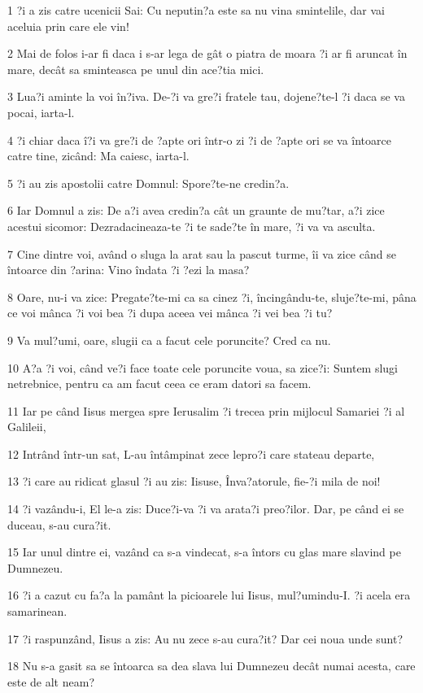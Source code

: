 \par 1 ?i a zis catre ucenicii Sai: Cu neputin?a este sa nu vina smintelile, dar vai aceluia prin care ele vin!
\par 2 Mai de folos i-ar fi daca i s-ar lega de gât o piatra de moara ?i ar fi aruncat în mare, decât sa sminteasca pe unul din ace?tia mici.
\par 3 Lua?i aminte la voi în?iva. De-?i va gre?i fratele tau, dojene?te-l ?i daca se va pocai, iarta-l.
\par 4 ?i chiar daca î?i va gre?i de ?apte ori într-o zi ?i de ?apte ori se va întoarce catre tine, zicând: Ma caiesc, iarta-l.
\par 5 ?i au zis apostolii catre Domnul: Spore?te-ne credin?a.
\par 6 Iar Domnul a zis: De a?i avea credin?a cât un graunte de mu?tar, a?i zice acestui sicomor: Dezradacineaza-te ?i te sade?te în mare, ?i va va asculta.
\par 7 Cine dintre voi, având o sluga la arat sau la pascut turme, îi va zice când se întoarce din ?arina: Vino îndata ?i ?ezi la masa?
\par 8 Oare, nu-i va zice: Pregate?te-mi ca sa cinez ?i, încingându-te, sluje?te-mi, pâna ce voi mânca ?i voi bea ?i dupa aceea vei mânca ?i vei bea ?i tu?
\par 9 Va mul?umi, oare, slugii ca a facut cele poruncite? Cred ca nu.
\par 10 A?a ?i voi, când ve?i face toate cele poruncite voua, sa zice?i: Suntem slugi netrebnice, pentru ca am facut ceea ce eram datori sa facem.
\par 11 Iar pe când Iisus mergea spre Ierusalim ?i trecea prin mijlocul Samariei ?i al Galileii,
\par 12 Intrând într-un sat, L-au întâmpinat zece lepro?i care stateau departe,
\par 13 ?i care au ridicat glasul ?i au zis: Iisuse, Înva?atorule, fie-?i mila de noi!
\par 14 ?i vazându-i, El le-a zis: Duce?i-va ?i va arata?i preo?ilor. Dar, pe când ei se duceau, s-au cura?it.
\par 15 Iar unul dintre ei, vazând ca s-a vindecat, s-a întors cu glas mare slavind pe Dumnezeu.
\par 16 ?i a cazut cu fa?a la pamânt la picioarele lui Iisus, mul?umindu-I. ?i acela era samarinean.
\par 17 ?i raspunzând, Iisus a zis: Au nu zece s-au cura?it? Dar cei noua unde sunt?
\par 18 Nu s-a gasit sa se întoarca sa dea slava lui Dumnezeu decât numai acesta, care este de alt neam?
